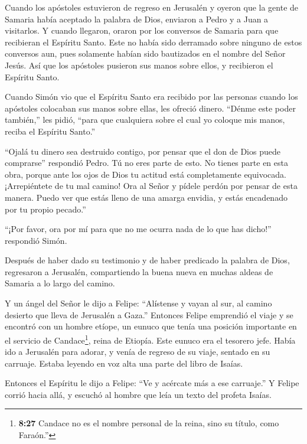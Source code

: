  Cuando los apóstoles estuvieron de regreso en Jerusalén y
oyeron que la gente de Samaria había aceptado la palabra de Dios,
enviaron a Pedro y a Juan a visitarlos.  Y cuando llegaron,
oraron por los conversos de Samaria para que recibieran el Espíritu
Santo.  Este no había sido derramado sobre ninguno de estos
conversos aun, pues solamente habían sido bautizados en el nombre del
Señor Jesús.  Así que los apóstoles pusieron sus manos
sobre ellos, y recibieron el Espíritu Santo.

 Cuando Simón vio que el Espíritu Santo era recibido por
las personas cuando los apóstoles colocaban sus manos sobre ellas, les
ofreció dinero.  ``Dénme este poder también,'' les pidió,
``para que cualquiera sobre el cual yo coloque mis manos, reciba el
Espíritu Santo.''

 ``Ojalá tu dinero sea destruido contigo, por pensar que el
don de Dios puede comprarse'' respondió Pedro.  Tú no eres
parte de esto. No tienes parte en esta obra, porque ante los ojos de
Dios tu actitud está completamente equivocada. 
¡Arrepiéntete de tu mal camino! Ora al Señor y pídele perdón por pensar
de esta manera.  Puedo ver que estás lleno de una amarga
envidia, y estás encadenado por tu propio pecado.''

 ``¡Por favor, ora por mí para que no me ocurra nada de lo
que has dicho!'' respondió Simón.

 Después de haber dado su testimonio y de haber predicado
la palabra de Dios, regresaron a Jerusalén, compartiendo la buena nueva
en muchas aldeas de Samaria a lo largo del camino.

 Y un ángel del Señor le dijo a Felipe: ``Alístense y vayan
al sur, al camino desierto que lleva de Jerusalén a Gaza.''
 Entonces Felipe emprendió el viaje y se encontró con un
hombre etíope, un eunuco que tenía una posición importante en el
servicio de Candace\footnote{\textbf{8:27} Candace no es el nombre
  personal de la reina, sino su título, como Faraón.''}, reina de
Etiopía. Este eunuco era el tesorero jefe. Había ido a Jerusalén para
adorar,  y venía de regreso de su viaje, sentado en su
carruaje. Estaba leyendo en voz alta una parte del libro de Isaías.

 Entonces el Espíritu le dijo a Felipe: ``Ve y acércate más
a ese carruaje.''  Y Felipe corrió hacia allá, y escuchó al
hombre que leía un texto del profeta Isaías.

